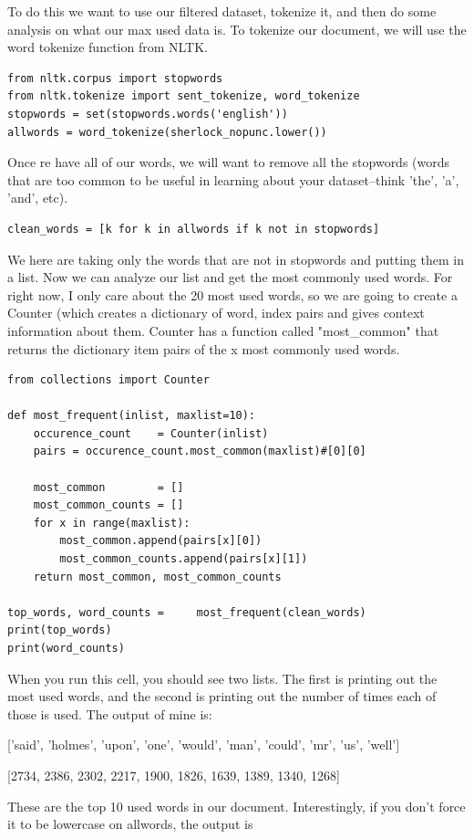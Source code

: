 \documentclass{article}
\begin{document}
 To do this we want to use our filtered dataset, tokenize it, and then do some analysis on what our max used data is. To tokenize our document,  we will use the word tokenize function from NLTK.
  \begin{verbatim}
from nltk.corpus import stopwords
from nltk.tokenize import sent_tokenize, word_tokenize
stopwords = set(stopwords.words('english')) 
allwords = word_tokenize(sherlock_nopunc.lower())
 \end{verbatim}
 Once re have all of our words, we will want to remove all the stopwords (words that are too common to be useful in learning about your dataset--think 'the', 'a', 'and', etc).
 \begin{verbatim}
clean_words = [k for k in allwords if k not in stopwords]
 \end{verbatim}
 We here are taking only the words that are not in stopwords and putting them in a list. Now we can analyze our list and get the most commonly used words. For right now, I only care about the 20 most used words, so we are going to create a Counter (which creates a dictionary of word, index pairs and gives context information about them. Counter has a function called "most\_common" that returns the dictionary item pairs of the x most commonly used words.
 
\begin{verbatim}
from collections import Counter

def most_frequent(inlist, maxlist=10):
    occurence_count    = Counter(inlist)
    pairs = occurence_count.most_common(maxlist)#[0][0]

    most_common        = []
    most_common_counts = []
    for x in range(maxlist):
        most_common.append(pairs[x][0])
        most_common_counts.append(pairs[x][1])
    return most_common, most_common_counts

top_words, word_counts =     most_frequent(clean_words)
print(top_words)
print(word_counts)
\end{verbatim}
When you run this cell, you should see two lists. The first is printing out the most used words, and the second is printing out the number of times each of those is used. 
The output of mine is: 

['said', 'holmes', 'upon', 'one', 'would', 'man', 'could', 'mr', 'us', 'well']

[2734, 2386, 2302, 2217, 1900, 1826, 1639, 1389, 1340, 1268]

These are the top 10 used words in our document. Interestingly, if you don't force it to be lowercase on allwords, the output is 
\end{document}
